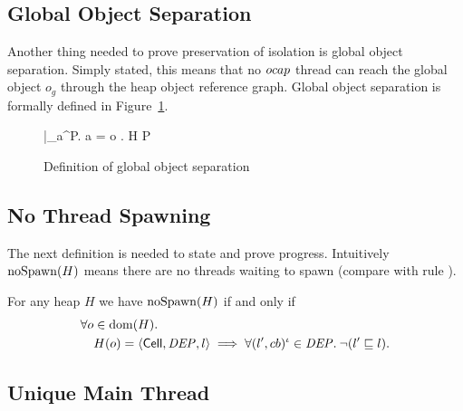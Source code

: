 \subsection{Global Object Separation}%
\label{sub:global_object_separation}

Another thing needed to prove preservation of isolation is global object
separation. Simply stated, this means that no $\mbox{$ocap$}$ thread can reach the global
object $o_g$ through the heap object reference graph. Global object separation
is formally defined in Figure~\ref{fig:def_gsep}.

\begin{figure}
  {\forall \FS|_a^\iota \in P. \: a = \ocap \implies \forall o \in {}. \:  }
  {H \vdash P \tsep \gsep}

  \caption{Definition of global object separation}
  \label{fig:def_gsep}
\end{figure}

\subsection{No Thread Spawning}%
\label{sub:no_thread_spawning}

The next definition is needed to state and prove progress. Intuitively
$\mbox{$\mathrm{noSpawn}$}(H)$ means there are no threads waiting to spawn (compare with rule
\ESpawn{}).
\begin{definition}[No Spawn]
  For any heap $H$ we have $\mbox{$\mathrm{noSpawn}$}(H)$ if and only if
  \begin{equation}
    \begin{aligned}
      \forall o &\in \mbox{$\mathrm{dom}$}(H). \\
        & H(o) = \mbox{$\langle \mbox{$\mathsf{Cell}$}{}, \mathit{DEP}, l \rangle$} \implies 
        \forall (l', cb)^\iota \in \mathit{DEP}. \: \lnot (l' \sqsubseteq l).
    \end{aligned}
  \end{equation}
\end{definition}

\subsection{Unique Main Thread}%
\label{sub:unique_main_thread}

